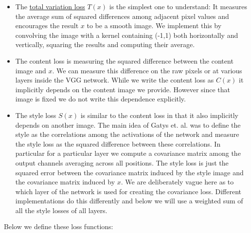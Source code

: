 \documentclass[]{book}
\providecommand{\tightlist}{%
  \setlength{\itemsep}{0pt}\setlength{\parskip}{0pt}}
\theoremstyle{definition}
\theoremstyle{definition}
\theoremstyle{definition}
\theoremstyle{remark}
\begin{document}
\begin{itemize}
\tightlist
\item
  The
  \href{https://en.wikipedia.org/wiki/Total_variation_denoising}{total
  variation loss} \(T(x)\) is the simplest one to understand: It
  measures the average sum of squared differences among adjacent pixel
  values and encourages the result \(x\) to be a smooth image. We
  implement this by convolving the image with a kernel containing (-1,1)
  both horizontally and vertically, squaring the results and computing
  their average.
\item
  The content loss is measuring the squared difference between the
  content image and \(x\). We can measure this difference on the raw
  pixels or at various layers inside the VGG network. While we write the
  content loss as \(C(x)\) it implicitly depends on the content image we
  provide. However since that image is fixed we do not write this
  dependence explicitly.
\item
  The style loss \(S(x)\) is similar to the content loss in that it also
  implicitly depends on another image. The main idea of Gatys et. al.
  was to define the style as the correlations among the activations of
  the network and measure the style loss as the squared difference
  between these correlations. In particular for a particular layer we
  compute a covariance matrix among the output channels averaging across
  all positions. The style loss is just the squared error between the
  covariance matrix induced by the style image and the covariance matrix
  induced by \(x\). We are deliberately vague here as to which layer of
  the network is used for creating the covariance loss. Different
  implementations do this differently and below we will use a weighted
  sum of all the style losses of all layers.
\end{itemize}

Below we define these loss functions:
\end{document}
